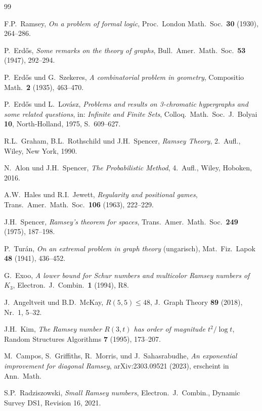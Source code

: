 \documentclass[12pt,a4paper]{amsart}
\theoremstyle{definition}
\theoremstyle{remark}
\begin{document}
\begin{thebibliography}{99}

F.P.~Ramsey,
\textit{On a problem of formal logic},
Proc.\ London Math.\ Soc.\ \textbf{30} (1930), 264--286.

P.~Erd\H{o}s,
\textit{Some remarks on the theory of graphs},
Bull.\ Amer.\ Math.\ Soc.\ \textbf{53} (1947), 292--294.

P.~Erd\H{o}s und G.~Szekeres,
\textit{A combinatorial problem in geometry},
Compositio Math.\ \textbf{2} (1935), 463--470.

P.~Erd\H{o}s und L.~Lov\'asz,
\textit{Problems and results on 3-chromatic hypergraphs and some related questions},
in: \textit{Infinite and Finite Sets}, Colloq.\ Math.\ Soc.\ J.\ Bolyai \textbf{10},
North-Holland, 1975, S.~609--627.

R.L.~Graham, B.L.~Rothschild und J.H.~Spencer,
\textit{Ramsey Theory}, 2.~Aufl., Wiley, New York, 1990.

N.~Alon und J.H.~Spencer,
\textit{The Probabilistic Method}, 4.~Aufl., Wiley, Hoboken, 2016.

A.W.~Hales und R.I.~Jewett,
\textit{Regularity and positional games},
Trans.\ Amer.\ Math.\ Soc.\ \textbf{106} (1963), 222--229.

J.H.~Spencer,
\textit{Ramsey's theorem for spaces},
Trans.\ Amer.\ Math.\ Soc.\ \textbf{249} (1975), 187--198.

P.~Tur\'an,
\textit{On an extremal problem in graph theory} (ungarisch),
Mat.\ Fiz.\ Lapok \textbf{48} (1941), 436--452.

G.~Exoo,
\textit{A lower bound for Schur numbers and multicolor Ramsey numbers of $K_3$},
Electron.\ J.\ Combin.\ \textbf{1} (1994), R8.

J.~Angeltveit und B.D.~McKay,
\textit{$R(5,5) \le 48$},
J.\ Graph Theory \textbf{89} (2018), Nr.~1, 5--32.

J.H.~Kim,
\textit{The Ramsey number $R(3,t)$ has order of magnitude $t^2/\log t$},
Random Structures Algorithms \textbf{7} (1995), 173--207.

M.~Campos, S.~Griffiths, R.~Morris, und J.~Sahasrabudhe,
\textit{An exponential improvement for diagonal Ramsey},
arXiv:2303.09521 (2023), erscheint in Ann.\ Math.

S.P.~Radziszowski,
\textit{Small Ramsey numbers},
Electron.\ J.\ Combin., Dynamic Survey DS1, Revision 16, 2021.

\end{thebibliography}
\end{document}
